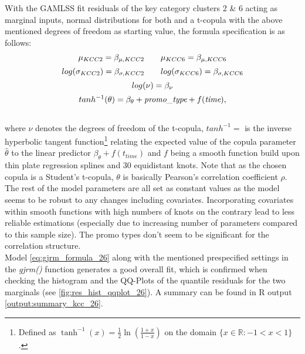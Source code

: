 With the \ac{GAMLSS} fit residuals of the key category clusters 2 \& 6 acting as marginal inputs, normal distributions for both and a t-copula with the above mentioned degrees of freedom as starting value, the formula specification is as follows: \\



\begin{equation}
\begin{array}{c}
\mu_{KCC 2}=\beta_{\mu,KCC2} \qquad \mu_{KCC 6}=\beta_{\mu,KCC6}  \\  \noalign{\vskip5pt}

log(\sigma_{KCC 2})=\beta_{\sigma,KCC2} \qquad log(\sigma_{KCC 6})=\beta_{\sigma,KCC6} \\  \noalign{\vskip5pt}

log(\nu) = \beta_{\nu} \\  \noalign{\vskip5pt}

tanh^{-1}(\theta)=\beta_{\theta} + \textit{promo\_type} +f(\textit{time}),
\end{array}
\label{eq:gjrm_formula_26}
\end{equation} \\

where $\nu$ denotes the degrees of freedom of the t-copula, $tanh^{-1} = $ is the inverse hyperbolic tangent function\footnote{Defined as $\tanh ^{-1} (x)=\frac{1}{2} \ln \left(\frac{1+x}{1-x}\right)$ on the domain $ \{ x \in \mathbb{R}:-1<x<1\}$.} relating the expected value of the copula parameter $\hat{\theta}$ to the linear predictor $\beta_{\theta}+f\left(t_{time}\right)$ and $f$ being a smooth function build upon thin plate regression splines and 30 equidistant knots. Note that as the chosen copula is a Student's t-copula, $\theta$ is basically Pearson's correlation coefficient $\rho$. The rest of the model parameters are all set as constant values as the model seems to be robust to any changes including covariates. Incorporating covariates within smooth functions with high numbers of knots on the contrary lead to less reliable estimations (especially due to increasing number of parameters compared to this sample size). The promo types don't seem to be significant for the correlation structure. \\

Model \ref{eq:gjrm_formula_26} along with the mentioned prespecified settings in the \textit{gjrm()} function generates a good overall fit, which is confirmed when checking the histogram and the QQ-Plots of the quantile residuals for the two marginals (see \autoref{fig:res_hist_qqplot_26}). A summary can be found in R output \ref{output:summary_kcc_26}.
\\


